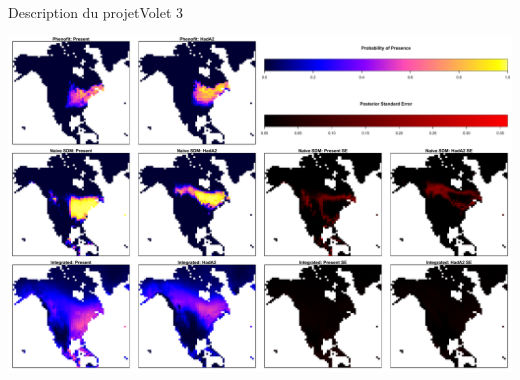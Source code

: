 \documentclass{eecslides}
\begin{document}
	
	\begin{frame}{Description du projet}{Volet 3}
		\begin{center}
		\includegraphics[height=0.6\textheight]{model_integration}\\
		\end{center}
	\end{frame}
\end{document}
